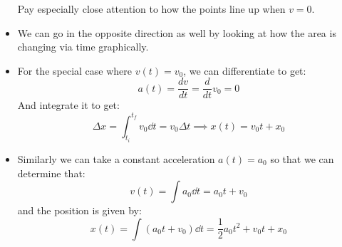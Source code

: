 \begin{itemize}
\begin{example}
        \begin{center}
        \end{center}
        \begin{center}
        \end{center}
        Pay especially close attention to how the points line up when $v=0$.
    \end{example}
    \item We can go in the opposite direction as well by looking at how the area is changing via time graphically.
    \item For the special case where $v(t)=v_0$, we can differentiate to get:
    \begin{equation}
        a(t) = \frac{dv}{dt}=\frac{d}{dt}v_0=0
        \label{eq:}
    \end{equation}
    And integrate it to get:
    \begin{equation}
        \Delta x = \int_{t_i}^{t_f} v_0 \dd{t} = v_0 \Delta t \implies x(t)=v_0t+x_0
    \end{equation}
    \item Similarly we can take a constant acceleration $a(t)=a_0$ so that we can determine that:
    \begin{equation}
        v(t) = \int a_0 \dd{t} = a_0t+v_0
        \label{eq:}
    \end{equation}
    and the position is given by:
    \begin{equation}
        x(t) = \int (a_0t+v_0) \dd{t} = \frac{1}{2}a_0t^2+v_0t+x_0
        \label{eq:}
    \end{equation}
    
    
\end{itemize}
